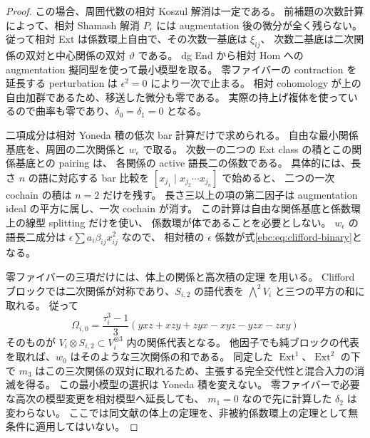 \begin{proof}
この場合、周囲代数の相対 Koszul 解消は一定である。
前補題の次数計算によって、相対 Shamash 解消 $P_\epsilon$ には
augmentation 後の微分が全く残らない。
従って相対 Ext は係数環上自由で、その次数一基底は $\xi_{ij}$、
次数二基底は二次関係の双対と中心関係の双対 $\vartheta$ である。
dg End から相対 Hom への augmentation 擬同型を使って最小模型を取る。
零ファイバーの contraction を延長する perturbation は
$\epsilon^2=0$ により一次で止まる。
相対 cohomology が上の自由加群であるため、移送した微分も零である。
実際の持上げ複体を使っているので曲率も零であり、$\delta_0=\delta_1=0$ となる。

二項成分は相対 Yoneda 積の低次 bar 計算だけで求められる。
自由な最小関係基底を、周囲の二次関係と $w_\epsilon$ で取る。
次数一の二つの Ext class の積とこの関係基底との pairing は、
各関係の active 語長二の係数である。
具体的には、長さ $n$ の語に対応する bar 比較を
$[x_{j_1}\mid x_{j_2}\cdots x_{j_n}]$ で始めると、
二つの一次 cochain の積は $n=2$ だけを残す。
長さ三以上の項の第二因子は augmentation ideal の平方に属し、一次 cochain が消す。
この計算は自由な関係基底と係数環上の線型 splitting だけを使い、
係数環が体であることを必要としない。
$w_\epsilon$ の語長二成分は
$\epsilon\sum a_i\beta_{ij}x_{ij}^2$ なので、
相対積の $\epsilon$ 係数が式\eqref{ebc:eq:clifford-binary}となる。

零ファイバーの三項だけには、体上の関係と高次積の定理
\cite[Theorem~A, Corollary~B]{NFMLPWZExt}を用いる。
Clifford ブロックでは二次関係が対称であり、$S_{i,2}$ の語代表を
$\bigwedge^2V_i$ と三つの平方の和に取れる。
従って
\[
 \Omega_{i,0}=\frac{\tau_i^3-1}{3}
 (yxz+xzy+zyx-xyz-yzx-zxy)
\]
そのものが $V_i\otimes S_{i,2}\subset V_i^{\otimes3}$ 内の関係代表となる。
他因子でも純ブロックの代表を取れば、$w_0$ はそのような三次関係の和である。
同定した $\operatorname{Ext}^1$、$\operatorname{Ext}^2$ の下で
$m_3$ はこの三次関係の双対に取れるため、主張する完全交代性と混合入力の消滅を得る。
この最小模型の選択は Yoneda 積を変えない。
零ファイバーで必要な高次の模型変更を相対模型へ延長しても、
$m_1=0$ なので先に計算した $\delta_2$ は変わらない。
ここでは同文献の体上の定理を、非被約係数環上の定理として無条件に適用してはいない。


\end{proof}
